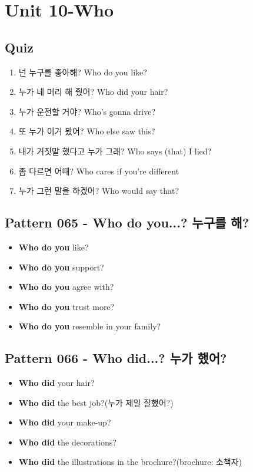 \documentclass[11pt]{oblivoir}
\begin{document}
\section{Unit 10-Who}
\subsection{Quiz}
\begin{enumerate}
  \color{black} \item 넌 누구를 좋아해?
    \color{light-gray} Who do you like?
  \color{red} \item 누가 네 머리 해 줬어?
    \color{light-gray} Who did your hair?
  \color{red} \item 누가 운전할 거야?
    \color{light-gray} Who's gonna drive?
  \color{red} \item 또 누가 이거 봤어?
    \color{light-gray} Who else saw this?
  \color{red} \item 내가 거짓말 했다고 누가 그래?
    \color{light-gray} Who says (that) I lied?
  \color{red} \item 좀 다르면 어때?
    \color{light-gray} Who cares if you're different
   \color{red} \item 누가 그런 말을 하겠어?
    \color{light-gray} Who would say that?
\end{enumerate}

\subsection{Pattern 065 - Who do you...? 누구를 \texttildelow 해?}
\begin{itemize}
  \item \textbf{Who do you} like?
  \item \textbf{Who do you} support?
  \item \textbf{Who do you} agree with?
  \item \textbf{Who do you} trust more?
  \item \textbf{Who do you} resemble in your family?
\end{itemize}

\subsection{Pattern 066 - Who did...? 누가 \texttildelow 했어?}
\begin{itemize}
  \item \textbf{Who did} your hair?
  \item \textbf{Who did} the best job?(누가 제일 잘했어?)
  \item \textbf{Who did} your make-up?
  \item \textbf{Who did} the decorations?
  \item \textbf{Who did} the illustrations in the brochure?(brochure: 소책자)
\end{itemize}
\end{document}
